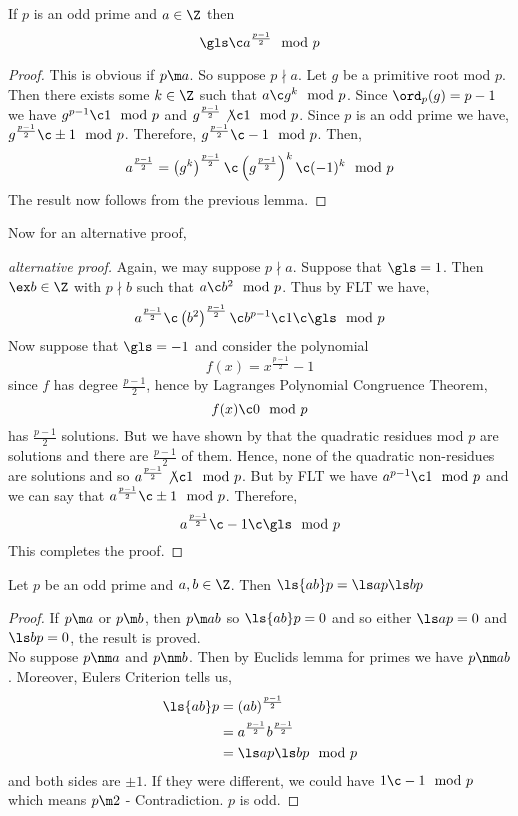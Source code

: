 \begin{nthm}
  If $p$ is an odd prime and $a \in \Z$ then
  $$ \gls \c a^{\frac{p-1}{2}}\mod p $$
\end{nthm}
\begin{proof}
  This is obvious if $p \m a$. So suppose $p \nmid a$. Let $g$ be a primitive root mod $p$. Then there exists some $k \in \Z$ such that $a \c g^k \mod p$. Since $\ord_p(g) = p - 1$ we have $g^{p-1} \c 1 \mod p$ and $g^{\frac{p-1}{2}}\not\c 1 \mod p$. Since $p$ is an odd prime we have, $g^{\frac{p-1}{2}}\c \pm 1 \mod p$.
  Therefore, $g^{\frac{p-1}{2}} \c -1 \mod p$. Then,
  $$ a^{\frac{p-1}{2}} = \left(g^k\right)^{\frac{p-1}{2}} \c \left(g^{\frac{p-1}{2}} \right)^k \c (-1)^k \mod p $$
  The result now follows from the previous lemma.
\end{proof}

Now for an alternative proof,
\begin{proof}[alternative proof]
  Again, we may suppose $p \nmid a$. Suppose that $\gls = 1$. Then $\ex b \in \Z$ with $p \nmid b$ such that $a \c b^2 \mod p$. Thus by FLT we have,
  $$ a^{\frac{p-1}{2}} \c \left(b^2\right)^{\frac{p-1}{2}} \c b^{p-1} \c 1 \c \gls \mod p $$
  Now suppose that $\gls = -1$ and consider the polynomial
  $$ f(x) = x^{\frac{p-1}{2}}-1 $$
  since $f$ has degree $\frac{p-1}{2}$, hence by Lagranges Polynomial Congruence Theorem,
  $$ f(x) \c 0 \mod p $$
  has $\frac{p-1}{2}$ solutions. But we have shown by that the quadratic residues mod $p$ are solutions and there are $\frac{p-1}{2}$ of them. Hence, none of the quadratic non-residues are solutions and so $a^{\frac{p-1}{2}} \not\c 1 \mod p$. But by FLT we have $a^{p-1} \c 1 \mod p$ and we can say that $a^{\frac{p-1}{2}} \c \pm 1 \mod p$. Therefore,
  $$ a^{\frac{p-1}{2}} \c -1 \c \gls \mod p $$
  This completes the proof.
\end{proof}

\begin{nthm}
  Let $p$ be an odd prime and $a, b \in \Z$. Then $\ls{ab} p = \ls a p \ls b p$
\end{nthm}
\begin{proof}
  If $p \m a$ or $p \m b$, then $p \m ab$ so $\ls{ab} p = 0$ and so either $\ls a p = 0$ and $\ls b p = 0$, the result is proved.\\
  No suppose $p \nm a$ and $p \nm b$. Then by Euclids lemma for primes we have $p \nm ab$. Moreover, Eulers Criterion tells us,
  \begin{align*}
    \ls{ab} p &= (ab)^{\frac{p-1}{2}} \\
    &= a^{\frac{p-1}{2}}b^{\frac{p-1}{2}} \\
    &= \ls a p \ls b p \mod p
  \end{align*}
  and both sides are $\pm 1$. If they were different, we could have $1 \c -1 \mod p$ which means $p \m 2$ - Contradiction. $p$ is odd.
\end{proof}

